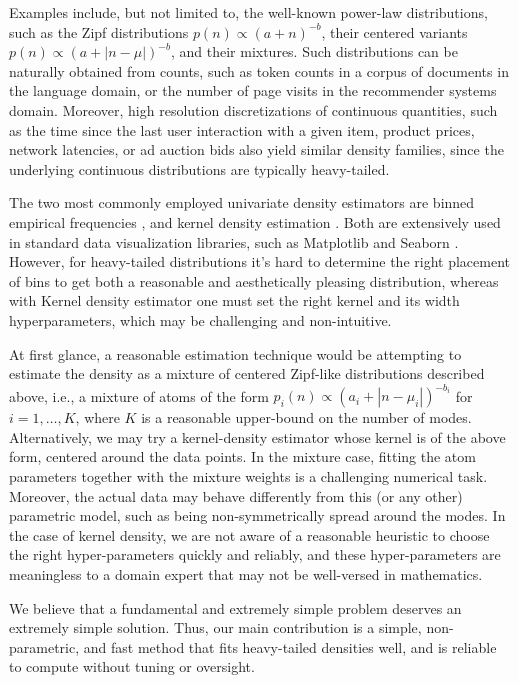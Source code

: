 \documentclass[10pt]{article} %
\begin{document}
Examples include, but not limited to, the well-known power-law distributions, such as the Zipf distributions $p(n)\propto (a+n)^{-b}$, their centered variants $p(n) \propto (a + |n - \mu|)^{-b}$, and their mixtures. Such distributions can be naturally obtained from counts, such as token counts in a corpus of documents in the language domain, or the number of page visits in the recommender systems domain. Moreover, high resolution discretizations of continuous quantities, such as the time since the last user interaction with a given item, product prices, network latencies, or ad auction bids also yield similar density families, since the underlying continuous distributions are typically heavy-tailed.

The two most commonly employed univariate density estimators are binned empirical frequencies \citep{binning_pearson}, and kernel density estimation \citep{kde_parzen,kde_rosenblatt}. Both are extensively used in standard data visualization libraries, such as Matplotlib \citep{matplotlib} and Seaborn \citep{seaborn}. However, for heavy-tailed distributions it's hard to determine the right placement of bins to get both a reasonable and aesthetically pleasing distribution, whereas with Kernel density estimator one must set the right kernel and its width hyperparameters, which may be challenging and non-intuitive. 

At first glance, a reasonable estimation technique would be attempting to estimate the density as a mixture of centered Zipf-like distributions described above, i.e., a mixture of atoms of the form $p_i(n) \propto (a_i + |n - \mu_i|)^{-b_i}$ for $i = 1, \dots, K$, where $K$ is a reasonable upper-bound on the number of modes. Alternatively, we may try a kernel-density estimator whose kernel is of the above form, centered around the data points. In the mixture case, fitting the atom parameters together with the mixture weights is a challenging numerical task. Moreover, the actual data may behave differently from this (or any other) parametric model, such as being non-symmetrically spread around the modes. In the case of kernel density, we are not aware of a reasonable heuristic to choose the right hyper-parameters quickly and reliably, and these hyper-parameters are meaningless to a domain expert that may not be well-versed in mathematics.

We believe that a fundamental and extremely simple problem deserves an extremely simple solution. Thus, our main contribution is a simple, non-parametric, and fast method that fits heavy-tailed densities well, and is reliable to compute without tuning or oversight. 
\end{document}
